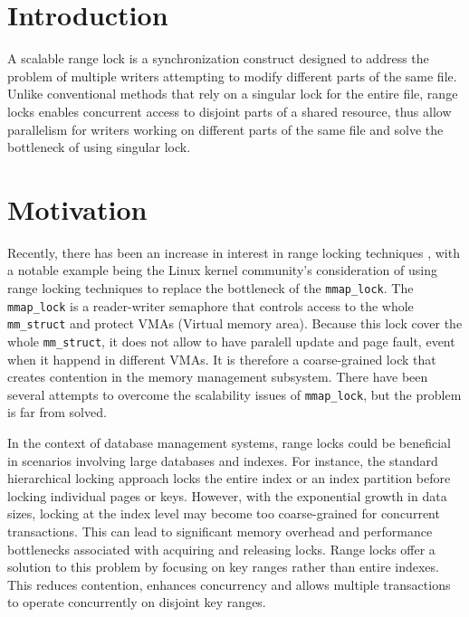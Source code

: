\section{Introduction}

A scalable range lock is a synchronization construct designed to address the problem of multiple writers attempting to modify different parts of the same file. Unlike conventional methods that rely on a singular lock for the entire file, range locks enables concurrent access to disjoint parts of a shared resource, thus allow parallelism for writers working on different parts of the same file and solve the bottleneck of using singular lock.

\section{Motivation}
Recently, there has been an increase in interest in range locking techniques \parencite{readerWriterLocks2017, mapleTree2021, mmapLock2022}, with a notable example being the Linux kernel community's consideration of using range locking techniques to replace the bottleneck of the \texttt{mmap\_lock}. The \texttt{mmap\_lock} is a reader-writer semaphore that controls access to the whole \texttt{mm\_struct}\parencite{mmstruct2023} and protect VMAs (Virtual memory area). Because this lock cover the whole \texttt{mm\_struct}, it does not allow to have paralell update and page fault, event when it happend in different VMAs. It is therefore a coarse-grained lock that creates contention in the memory management subsystem. There have been several attempts to overcome the scalability issues of \texttt{mmap\_lock}, but the problem is far from solved\parencite{mmapLock2022}.

In the context of database management systems, range locks could be beneficial in scenarios involving large databases and indexes. For instance, the standard hierarchical locking approach locks the entire index or an index partition before locking individual pages or keys. However, with the exponential growth in data sizes, locking at the index level may become too coarse-grained for concurrent transactions\parencite{Graefe2020}. This can lead to significant memory overhead and performance bottlenecks associated with acquiring and releasing locks. Range locks offer a solution to this problem by focusing on key ranges rather than entire indexes. This reduces contention, enhances concurrency and allows multiple transactions to operate concurrently on disjoint key ranges. 

